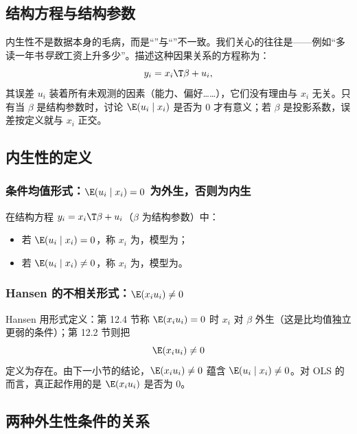 \subsection{结构方程与结构参数}

内生性不是数据本身的毛病，而是“”与“”不一致。我们关心的往往是——例如“多读一年书\emph{导致}工资上升多少”。描述这种因果关系的方程称为：
\[
y_i=x_i\T\beta+u_i,
\]
其误差 $u_i$ 装着所有未观测的因素（能力、偏好……），它们没有理由与 $x_i$ 无关。只有当 $\beta$ 是结构参数时，讨论 $\E(u_i\mid x_i)$ 是否为 $0$ 才有意义；若 $\beta$ 是投影系数，误差按定义就与 $x_i$ 正交。

\subsection{内生性的定义}

\subsubsection{条件均值形式：\texorpdfstring{$\E(u_i\mid x_i)=0$}{E(u|x)=0} 为外生，否则为内生}

\begin{defn}[外生与内生]\label{def:U07-endog}
在结构方程 $y_i=x_i\T\beta+u_i$（$\beta$ 为结构参数）中：
\begin{itemize}
  \item 若 $\E(u_i\mid x_i)=0$，称 $x_i$ 为，模型为；
  \item 若 $\E(u_i\mid x_i)\neq0$，称 $x_i$ 为，模型为。
\end{itemize}
\end{defn}

\subsubsection{Hansen 的不相关形式：\texorpdfstring{$\E(x_iu_i)\neq0$}{E(xu) != 0}}

Hansen 用形式定义：第 12.4 节称 $\E(x_iu_i)=0$ 时 $x_i$ 对 $\beta$ 外生（这是比均值独立更弱的条件）；第 12.2 节则把
\[
\E(x_iu_i)\neq0
\]
定义为存在。由下一小节的结论，$\E(x_iu_i)\neq0$ 蕴含 $\E(u_i\mid x_i)\neq0$。对 OLS 的而言，真正起作用的是 $\E(x_iu_i)$ 是否为 $0$。

\subsection{两种外生性条件的关系}

